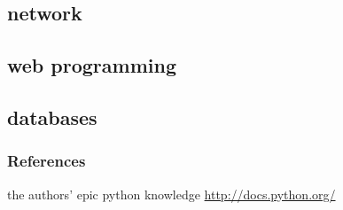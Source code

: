 \documentclass{beamer}
\begin{document}
\subsection*{network}

\subsection*{web programming}

\subsection*{databases}

\begin{frame}
	\frametitle{References}
	\begin{thebibliography}{3}
	 the authors' epic python knowledge
	 \url{http://docs.python.org/}
	\end{thebibliography}
\end{frame}
\end{document}
